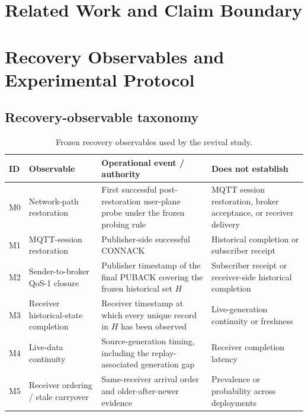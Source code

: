 \documentclass[journal]{IEEEtran}
\begin{document}

\section{Related Work and Claim Boundary}
\label{sec:related}


\section{Recovery Observables and Experimental Protocol}
\label{sec:protocol}

\subsection{Recovery-observable taxonomy}

\begin{table}[t]
\centering
\caption{Frozen recovery observables used by the revival study.}
\label{tab:observables}
\begin{tabular}{p{}p{}p{}p{}}
\toprule
\textbf{ID} & \textbf{Observable} & \textbf{Operational event / authority} & \textbf{Does not establish} \\
\midrule
M0 & Network-path restoration & First successful post-restoration user-plane probe under the frozen probing rule & MQTT session restoration, broker acceptance, or receiver delivery \\
M1 & MQTT-session restoration & Publisher-side successful CONNACK & Historical completion or subscriber receipt \\
M2 & Sender-to-broker QoS-1 closure & Publisher timestamp of the final PUBACK covering the frozen historical set $H$ & Subscriber receipt or receiver-side historical completion \\
M3 & Receiver historical-state completion & Receiver timestamp at which every unique record in $H$ has been observed & Live-generation continuity or freshness \\
M4 & Live-data continuity & Source-generation timing, including the replay-associated generation gap & Receiver completion latency \\
M5 & Receiver ordering / stale carryover & Same-receiver arrival order and older-after-newer evidence & Prevalence or probability across deployments \\
\bottomrule
\end{tabular}
\end{table}
\end{document}
